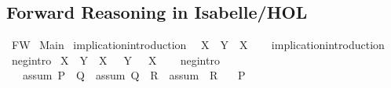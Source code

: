 %
\begin{isabellebody}%
%
%
\begin{isamarkuptext}%
\section*{Forward Reasoning in Isabelle/HOL}%
\end{isamarkuptext}\isamarkuptrue%
%
\isadelimtheory
%
\endisadelimtheory
%
\isatagtheory
{}\isamarkupfalse%
\ FW\isanewline
{}\ Main\isanewline
{}%
\endisatagtheory
{\isafoldtheory}%
%
\isadelimtheory
%
\endisadelimtheory
\isanewline
\isanewline
\isanewline
{}\isamarkupfalse%
\ implication{\isacharunderscore}{\kern0pt}introduction{\isacharcolon}{\kern0pt}\isanewline
\ \ {\isachardoublequoteopen}X\ {\isasymLongrightarrow}\ {\isacharparenleft}{\kern0pt}Y\ {\isasymlongrightarrow}\ X{\isacharparenright}{\kern0pt}{\isachardoublequoteclose}\isanewline
%
\isadelimproof
\ \ %
\endisadelimproof
%
\isatagproof
{}\isamarkupfalse%
%
\endisatagproof
{\isafoldproof}%
%
\isadelimproof
\isanewline
%
\endisadelimproof
\isanewline
{}\isamarkupfalse%
\ implication{\isacharunderscore}{\kern0pt}introduction\isanewline
\isanewline
{}\isamarkupfalse%
\ neg{\isacharunderscore}{\kern0pt}intro{\isacharcolon}{\kern0pt}\isanewline
\ {\isachardoublequoteopen}{\isacharparenleft}{\kern0pt}X\ {\isasymlongrightarrow}\ Y{\isacharparenright}{\kern0pt}\ {\isasymLongrightarrow}\ {\isacharparenleft}{\kern0pt}X\ {\isasymlongrightarrow}\ {\isasymnot}\ Y{\isacharparenright}{\kern0pt}\ {\isasymLongrightarrow}\ {\isasymnot}\ X{\isachardoublequoteclose}\isanewline
%
\isadelimproof
\ \ %
\endisadelimproof
%
\isatagproof
{}\isamarkupfalse%
%
\endisatagproof
{\isafoldproof}%
%
\isadelimproof
\isanewline
%
\endisadelimproof
\isanewline
{}\isamarkupfalse%
\ neg{\isacharunderscore}{\kern0pt}intro\isanewline
\isanewline
{}\isamarkupfalse%
\ \isanewline
\ \ \ assum{}{\isacharcolon}{\kern0pt}\ {\isachardoublequoteopen}P\ {\isasymlongrightarrow}\ Q{\isachardoublequoteclose}\ \ assum{}{\isacharcolon}{\kern0pt}\ {\isachardoublequoteopen}Q\ {\isasymlongrightarrow}\ R{\isachardoublequoteclose}\ \ assum{}{\isacharcolon}{\kern0pt}\ {\isachardoublequoteopen}{\isasymnot}\ R{\isachardoublequoteclose}\isanewline
\ \ \ {\isachardoublequoteopen}{\isasymnot}P{\isachardoublequoteclose}\isanewline

\end{isabellebody}
